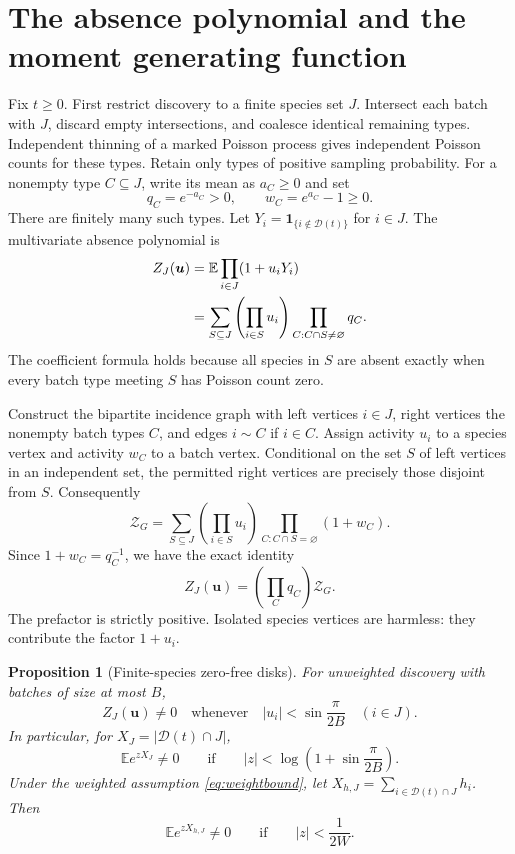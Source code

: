 \documentclass[11pt]{article}
\numberwithin{equation}{section}
\newtheorem{proposition}[theorem]{Proposition}
\theoremstyle{remark}
\newcommand{\E}{\mathbb E}
\newcommand{\ind}{\mathbf 1}
\newcommand{\calZ}{\mathcal Z}
\begin{document}
\section{The absence polynomial and the moment generating function}
\label{sec:absence}

Fix $t\ge0$. First restrict discovery to a finite species set $J$.
Intersect each batch with $J$, discard empty intersections, and coalesce
identical remaining types. Independent thinning of a marked Poisson process
gives independent Poisson counts for these types. Retain only types of
positive sampling probability. For a nonempty type
$C\subseteq J$, write its mean as $a_C\ge0$ and set
\[
 q_C=e^{-a_C}>0,\qquad w_C=e^{a_C}-1\ge0.
\]
There are finitely many such types. Let
$Y_i=\ind_{\{i\notin\mathcal D(t)\}}$ for $i\in J$. The multivariate
absence polynomial is
\begin{align}
 Z_J(\boldsymbol u)
 &=\E\prod_{i\in J}(1+u_iY_i)\notag\\
 &=\sum_{S\subseteq J}\left(\prod_{i\in S}u_i\right)
                  \prod_{C:C\cap S\ne\varnothing}q_C.
 \label{eq:absencepoly}
\end{align}
The coefficient formula holds because all species in $S$ are absent exactly
when every batch type meeting $S$ has Poisson count zero.

Construct the bipartite incidence graph with left vertices $i\in J$, right
vertices the nonempty batch types $C$, and edges $i\sim C$ if $i\in C$.
Assign activity $u_i$ to a species vertex and activity $w_C$ to a batch
vertex. Conditional on the set $S$ of left vertices in an independent set,
the permitted right vertices are precisely those disjoint from $S$.
Consequently
\[
 \calZ_G
 =\sum_{S\subseteq J}\left(\prod_{i\in S}u_i\right)
                  \prod_{C:C\cap S=\varnothing}(1+w_C).
\]
Since $1+w_C=q_C^{-1}$, we have the exact identity
\begin{equation}\label{eq:gasidentity}
 Z_J(\boldsymbol u)=\left(\prod_Cq_C\right)\calZ_G.
\end{equation}
The prefactor is strictly positive. Isolated species vertices are harmless:
they contribute the factor $1+u_i$.

\begin{proposition}[Finite-species zero-free disks]\label{prop:finitezero}
For unweighted discovery with batches of size at most $B$,
\begin{equation}\label{eq:absencezerofree}
 Z_J(\boldsymbol u)\ne0
 \quad\text{whenever}\quad |u_i|<\sin\frac\pi{2B}\quad(i\in J).
\end{equation}
In particular, for $X_J=|\mathcal D(t)\cap J|$,
\begin{equation}\label{eq:unweightedzerofree}
 \E e^{zX_J}\ne0
 \qquad\text{if}\qquad
 |z|<\log\left(1+\sin\frac\pi{2B}\right).
\end{equation}
Under the weighted assumption \eqref{eq:weightbound}, let
$X_{h,J}=\sum_{i\in\mathcal D(t)\cap J}h_i$. Then
\begin{equation}\label{eq:weightedzerofree}
 \E e^{zX_{h,J}}\ne0\qquad\text{if}\qquad |z|<\frac1{2W}.
\end{equation}
\end{proposition}
\end{document}
